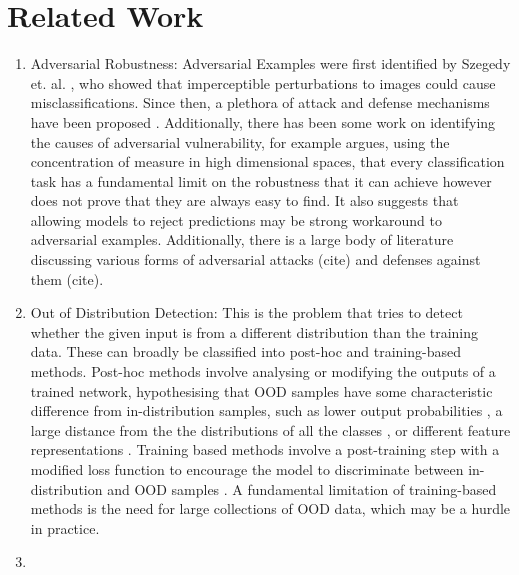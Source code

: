 \documentclass{article}
\begin{document}
    \section{Related Work}
        \begin{enumerate}
            \item 
                Adversarial Robustness: Adversarial Examples were first identified by Szegedy et. al. \cite{szegedy2014intriguingpropertiesneuralnetworks}, who showed that imperceptible perturbations to images could cause misclassifications. Since then, a plethora of attack and defense mechanisms have been proposed \cite{goodfellow2015explainingharnessingadversarialexamples, madry2019deeplearningmodelsresistant}. Additionally, there has been some work on identifying the causes of adversarial vulnerability, for example  \cite{shafahi2020adversarialexamplesinevitable} argues, using the concentration of measure in high dimensional spaces, that every classification task has a fundamental limit on the robustness that it can achieve however does not prove that they are always easy to find. It also suggests that allowing models to reject predictions may be strong workaround to adversarial examples. Additionally, there is a large body of literature discussing various forms of adversarial attacks (cite) and defenses against them (cite). 
            \item 
                Out of Distribution Detection: This is the problem that tries to detect whether the given input is from a different distribution than the training data. These can broadly be classified into post-hoc and training-based methods. Post-hoc methods involve analysing or modifying the outputs of a trained network, hypothesising that OOD samples have some characteristic difference from in-distribution samples, such as lower output probabilities \cite{hendrycks2018baselinedetectingmisclassifiedoutofdistribution}, a large distance from the the distributions of all the classes \cite{lee2018simpleunifiedframeworkdetecting}, or different feature representations \cite{sun2021reactoutofdistributiondetectionrectified}. Training based methods involve a post-training step with a modified loss function to encourage the model to discriminate between in-distribution and OOD samples \cite{sharifi2024gradientregularizedoutofdistributiondetection}. A fundamental limitation of training-based methods is the need for large collections of OOD data, which may be a hurdle in practice.
            \item 

\end{enumerate}
\end{document}
